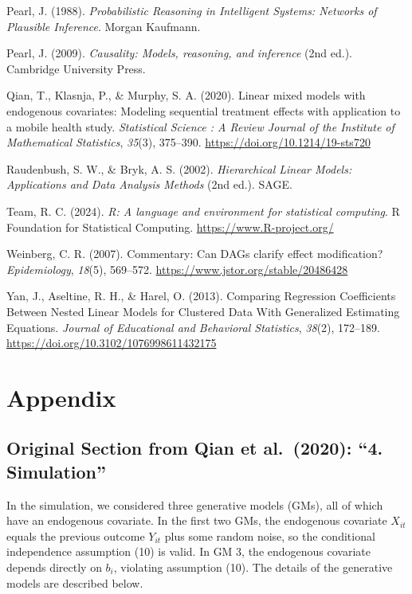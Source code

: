 \documentclass[
  12pt,
  a4paper,
]{article}
\newlength{\cslhangindent}
\newenvironment{CSLReferences}[2] %
 {\begin{list}{}{%
  \setlength{\itemindent}{0pt}
  \setlength{\leftmargin}{0pt}
  \setlength{\parsep}{0pt}
  \ifodd #1
   \setlength{\leftmargin}{\cslhangindent}
   \setlength{\itemindent}{-1\cslhangindent}
  \fi
  \setlength{\itemsep}{#2\baselineskip}}}
 {\end{list}}
\begin{document}
\begin{CSLReferences}{1}{0}
Pearl, J. (1988). \emph{Probabilistic Reasoning in Intelligent Systems:
Networks of Plausible Inference}. Morgan Kaufmann.

Pearl, J. (2009). \emph{Causality: Models, reasoning, and inference}
(2nd ed.). Cambridge University Press.

Qian, T., Klasnja, P., \& Murphy, S. A. (2020). Linear mixed models with
endogenous covariates: Modeling sequential treatment effects with
application to a mobile health study. \emph{Statistical Science : A
Review Journal of the Institute of Mathematical Statistics},
\emph{35}(3), 375--390. \url{https://doi.org/10.1214/19-sts720}

Raudenbush, S. W., \& Bryk, A. S. (2002). \emph{Hierarchical Linear
Models: Applications and Data Analysis Methods} (2nd ed.). SAGE.

Team, R. C. (2024). \emph{R: A language and environment for statistical
computing}. R Foundation for Statistical Computing.
\url{https://www.R-project.org/}

Weinberg, C. R. (2007). Commentary: Can DAGs clarify effect
modification? \emph{Epidemiology}, \emph{18}(5), 569--572.
\url{https://www.jstor.org/stable/20486428}

Yan, J., Aseltine, R. H., \& Harel, O. (2013). Comparing Regression
Coefficients Between Nested Linear Models for Clustered Data With
Generalized Estimating Equations. \emph{Journal of Educational and
Behavioral Statistics}, \emph{38}(2), 172--189.
\url{https://doi.org/10.3102/1076998611432175}

\end{CSLReferences}

\section{Appendix}\label{appendix}

\subsection{Original Section from Qian et al.~(2020): ``4.
Simulation''}\label{original-section-from-qian-et-al.-2020-4.-simulation}

In the simulation, we considered three generative models (GMs), all of
which have an endogenous covariate. In the first two GMs, the endogenous
covariate \(X_{it}\) equals the previous outcome \(Y_{it}\) plus some
random noise, so the conditional independence assumption (10) is valid.
In GM 3, the endogenous covariate depends directly on \(b_i\), violating
assumption (10). The details of the generative models are described
below.
\end{document}
